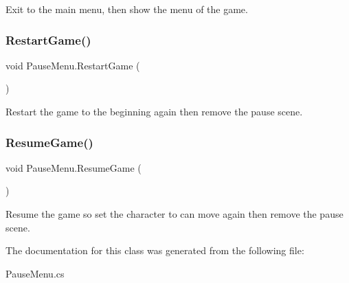 Exit to the main menu, then show the menu of the game. 

\hypertarget{class_pause_menu_a332ac40e332e7fab5f8f457f1acc1961}{}\label{class_pause_menu_a332ac40e332e7fab5f8f457f1acc1961} 
\subsubsection{\texorpdfstring{Restart\+Game()}{RestartGame()}}
{\footnotesize\ttfamily void Pause\+Menu.\+Restart\+Game (\begin{DoxyParamCaption}{ }\end{DoxyParamCaption})}



Restart the game to the beginning again then remove the pause scene. 

\hypertarget{class_pause_menu_a505c44b23587b6e53c7b89813337576b}{}\label{class_pause_menu_a505c44b23587b6e53c7b89813337576b} 
\subsubsection{\texorpdfstring{Resume\+Game()}{ResumeGame()}}
{\footnotesize\ttfamily void Pause\+Menu.\+Resume\+Game (\begin{DoxyParamCaption}{ }\end{DoxyParamCaption})}



Resume the game so set the character to can move again then remove the pause scene. 



The documentation for this class was generated from the following file\+:\begin{DoxyCompactItemize}
\item 
Pause\+Menu.\+cs\end{DoxyCompactItemize}
